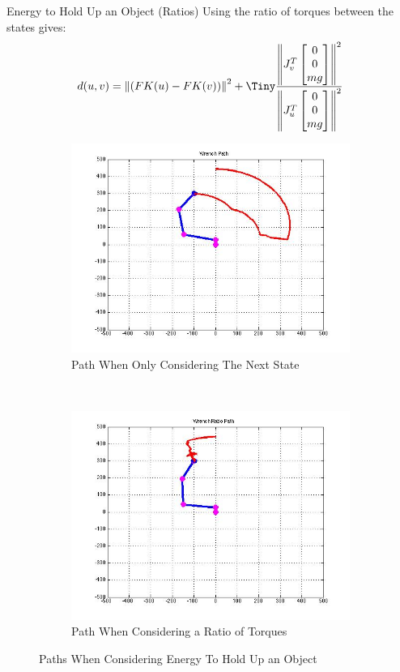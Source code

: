 \documentclass{beamer}
\newcommand{\bM}{\begin{bmatrix}}
\newcommand{\eM}{\end{bmatrix}}
\begin{document}
\begin{frame}{Energy to Hold Up an Object (Ratios)}
Using the ratio of torques between the states gives:
 $$	d(u,v) =  \left\|(FK(u)-FK(v))\right\|^2 + \Tiny\frac{\left\|J^T_v\bM 0 \\ 0 \\ mg \eM\right\|^2}{\left\|J^T_u\bM 0 \\ 0 \\ mg \eM\right\|^2}$$\normalsize
\begin{figure}[htb]
\centering
\begin{subfigure}[b]{0.5\textwidth}
\centering
\includegraphics[scale=.19]{PathPics/Wrench_Path.jpg}
\caption{Path When Only Considering The Next State}
\end{subfigure}%
~ 
\begin{subfigure}[b]{0.5\textwidth}
\centering
\includegraphics[scale=.19]{PathPics/Wrench_Ratio_Path.jpg}
\caption{Path When Considering a Ratio of Torques}
\end{subfigure}

\caption{Paths When Considering Energy To Hold Up an Object}
\label{fig:EnergyPaths2}
\end{figure}
\end{frame}
\end{document}
